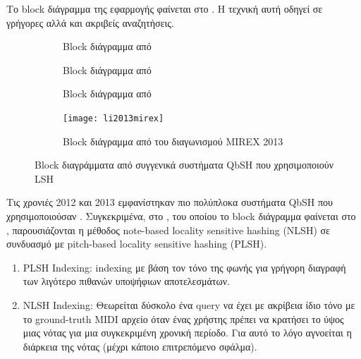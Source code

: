 Το block διάγραμμα της εφαρμογής φαίνεται στο .
Η τεχνική αυτή οδηγεί σε γρήγορες αλλά και ακριβείς αναζητήσεις.

\begin{figure}[htb]
    \centering
    \begin{subfigure}[t]{0.3\linewidth}
        \caption{Block διάγραμμα από \protect\cite{wang2012query}}
        \label{fig:wang2012query}
    \end{subfigure}\hfill
    \begin{subfigure}[t]{0.3\linewidth}
        \caption{Block διάγραμμα από \protect\cite{guo2012query}}
        \label{fig:guo2012query}
    \end{subfigure}\hfill
    \begin{subfigure}[t]{0.3\linewidth}
        \caption{Block διάγραμμα από \protect\cite{guo2013query}}
        \label{fig:guo2013query}
    \end{subfigure}
    \begin{subfigure}[t]{0.63\linewidth}
        \texttt{[image: li2013mirex]}
        \caption{Block διάγραμμα από \protect\cite{li2013mirex} του διαγωνισμού MIREX 2013}
        \label{fig:li2013mirex}
    \end{subfigure}
    \caption{Block διαγράμματα από συγγενικά συστήματα QbSH που χρησιμοποιούν LSH}
    \label{fig:many-lsb-blocks}
\end{figure}

Τις χρονιές 2012 και 2013 εμφανίστηκαν πιο πολύπλοκα συστήματα QbSH που χρησιμοποιούσαν \lsh{}.
Συγκεκριμένα, στο \cite{wang2012query}, του οποίου το block διάγραμμα φαίνεται στο ,
παρουσιάζονται η μέθοδος note-based locality sensitive hashing (NLSH)
σε συνδυασμό με pitch-based locality sensitive hashing (PLSH).
\begin{enumerate}
    \item PLSH Indexing:
    indexing με βάση τον τόνο της φωνής για γρήγορη διαγραφή των λιγότερο πιθανών υποψήφιων αποτελεσμάτων.
    \item NLSH Indexing:
    Θεωρείται δύσκολο ένα query να έχει με ακρίβεια ίδιο τόνο με το ground-truth MIDI αρχείο όταν ένας χρήστης πρέπει να κρατήσει το ύψος μιας νότας για μια συγκεκριμένη χρονική περίοδο.
    Για αυτό το λόγο αγνοείται η διάρκεια της νότας (μέχρι κάποιο επιτρεπόμενο σφάλμα).
\end{enumerate}

